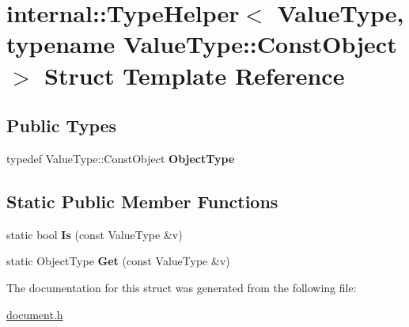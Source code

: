 \hypertarget{a00319}{}\section{internal\+:\+:Type\+Helper$<$ Value\+Type, typename Value\+Type\+:\+:Const\+Object $>$ Struct Template Reference}
\label{a00319}
\subsection*{Public Types}
\begin{DoxyCompactItemize}
\item 
typedef Value\+Type\+::\+Const\+Object {\bfseries Object\+Type}\hypertarget{a00319_a986df6ac09ceb6cc9ba9fd4d73e90495}{}\label{a00319_a986df6ac09ceb6cc9ba9fd4d73e90495}

\end{DoxyCompactItemize}
\subsection*{Static Public Member Functions}
\begin{DoxyCompactItemize}
\item 
static bool {\bfseries Is} (const Value\+Type \&v)\hypertarget{a00319_a843e707732c55f2178d399a0af13605a}{}\label{a00319_a843e707732c55f2178d399a0af13605a}

\item 
static Object\+Type {\bfseries Get} (const Value\+Type \&v)\hypertarget{a00319_ae6a797157c9b3d15ca4a32c48ea4bc73}{}\label{a00319_ae6a797157c9b3d15ca4a32c48ea4bc73}

\end{DoxyCompactItemize}


The documentation for this struct was generated from the following file\+:\begin{DoxyCompactItemize}
\item 
\hyperlink{a00473}{document.\+h}\end{DoxyCompactItemize}
